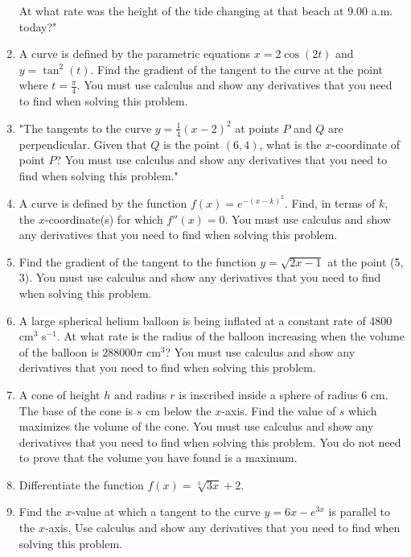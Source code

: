 \documentclass{article}
\begin{document}
\begin{enumerate}
At what rate was the height of the tide changing at that beach at 9.00 a.m. today?"
\vspace{3cm}
\item A curve is defined by the parametric equations \( x = 2\cos(2t) \) and \( y = \tan^2(t) \). Find the gradient of the tangent to the curve at the point where \( t = \frac{\pi}{4} \). You must use calculus and show any derivatives that you need to find when solving this problem.
\vspace{3cm}
\item "The tangents to the curve \( y = \frac{1}{4}(x-2)^2 \) at points \( P \) and \( Q \) are perpendicular. Given that \( Q \) is the point \( (6, 4) \), what is the \( x \)-coordinate of point \( P \)? You must use calculus and show any derivatives that you need to find when solving this problem."
\vspace{3cm}
\item A curve is defined by the function \( f(x) = e^{-(x-k)^2} \). Find, in terms of \( k \), the \( x \)-coordinate(s) for which \( f''(x) = 0 \). You must use calculus and show any derivatives that you need to find when solving this problem.
\vspace{3cm}
\item Find the gradient of the tangent to the function \( y = \sqrt{2x - 1} \) at the point (5, 3). You must use calculus and show any derivatives that you need to find when solving this problem.
\vspace{3cm}
\item A large spherical helium balloon is being inflated at a constant rate of 4800 cm\(^3\) s\(^{-1}\). At what rate is the radius of the balloon increasing when the volume of the balloon is 288000\(\pi\) cm\(^3\)? You must use calculus and show any derivatives that you need to find when solving this problem.
\vspace{3cm}
\item A cone of height \( h \) and radius \( r \) is inscribed inside a sphere of radius 6 cm. The base of the cone is \( s \) cm below the \( x \)-axis. Find the value of \( s \) which maximizes the volume of the cone. You must use calculus and show any derivatives that you need to find when solving this problem. You do not need to prove that the volume you have found is a maximum.
\vspace{3cm}
\item Differentiate the function \( f(x) = \sqrt[3]{3x} + 2 \).
\vspace{3cm}
\item Find the \( x \)-value at which a tangent to the curve \( y = 6x - e^{3x} \) is parallel to the \( x \)-axis. Use calculus and show any derivatives that you need to find when solving this problem.

\end{enumerate}
\end{document}
